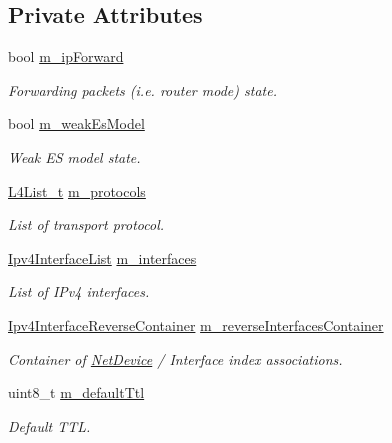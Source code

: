 \subsection*{Private Attributes}
\begin{DoxyCompactItemize}
\item 
bool \hyperlink{classns3_1_1Ipv4L3Protocol_a2dc4e9e459bb2ee5eab3af65df316a15}{m\+\_\+ip\+Forward}
\begin{DoxyCompactList}\small\item\em Forwarding packets (i.\+e. router mode) state. \end{DoxyCompactList}\item 
bool \hyperlink{classns3_1_1Ipv4L3Protocol_acbe9c4ed9ec7e33a55fa5b7c687e62f3}{m\+\_\+weak\+Es\+Model}
\begin{DoxyCompactList}\small\item\em Weak ES model state. \end{DoxyCompactList}\item 
\hyperlink{classns3_1_1Ipv4L3Protocol_aca93327d3f9e0fdce61d3e72927bd018}{L4\+List\+\_\+t} \hyperlink{classns3_1_1Ipv4L3Protocol_ab1c0a7a1a453db3c2ca3e47d7e65ff54}{m\+\_\+protocols}
\begin{DoxyCompactList}\small\item\em List of transport protocol. \end{DoxyCompactList}\item 
\hyperlink{classns3_1_1Ipv4L3Protocol_ada31b7e1708bfe1fb99a44f5c4f3271f}{Ipv4\+Interface\+List} \hyperlink{classns3_1_1Ipv4L3Protocol_a0b0f15b24a02f2c9a5d576f633aa2770}{m\+\_\+interfaces}
\begin{DoxyCompactList}\small\item\em List of I\+Pv4 interfaces. \end{DoxyCompactList}\item 
\hyperlink{classns3_1_1Ipv4L3Protocol_a6fdb18e99c2052467dcb9079673f9764}{Ipv4\+Interface\+Reverse\+Container} \hyperlink{classns3_1_1Ipv4L3Protocol_aa222dd0d50b6a835033b4cec1d63c096}{m\+\_\+reverse\+Interfaces\+Container}
\begin{DoxyCompactList}\small\item\em Container of \hyperlink{classns3_1_1NetDevice}{Net\+Device} / Interface index associations. \end{DoxyCompactList}\item 
uint8\+\_\+t \hyperlink{classns3_1_1Ipv4L3Protocol_aca3ce2700f8f7334464866ab2a76e427}{m\+\_\+default\+Ttl}
\begin{DoxyCompactList}\small\item\em Default T\+TL. \end{DoxyCompactList}\item 

\end{DoxyCompactItemize}
